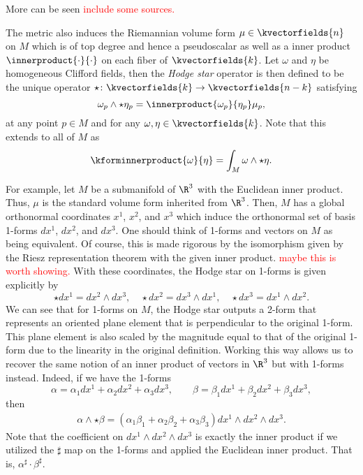   More can be seen \textcolor{red}{include some sources.}




The metric also induces the Riemannian volume form $\mu \in \kvectorfields{n}$ on $M$ which is of top degree and hence a pseudoscalar as well as a inner product $\innerproduct{\cdot}{\cdot}$ on each fiber of $\kvectorfields{k}$. Let $\omega$ and $\eta$ be homogeneous Clifford fields, then the \emph{Hodge star} operator is then defined to be the unique operator $\star \colon \kvectorfields{k} \to \kvectorfields{n-k}$ satisfying
\[
\omega_p \wedge \star \eta_p = \innerproduct{\omega_p}{\eta_p} \mu_p,
\]
at any point $p \in M$ and for any $\omega,\eta \in \kvectorfields{k}$.  Note that this extends to all of $M$ as
\[
\kforminnerproduct{\omega}{\eta} = \int_M \omega \wedge \star \eta.
\]

For example, let $M$ be a submanifold of $\R^3$ with the Euclidean inner product.  Thus, $\mu$ is the standard volume form inherited from $\R^3$. Then, $M$ has a global orthonormal coordinates $x^1$, $x^2$, and $x^3$ which induce the orthonormal set of basis 1-forms  $dx^1$, $dx^2$, and $dx^3$. One should think of 1-forms and vectors on $M$ as being equivalent. Of course, this is made rigorous by the isomorphism given by the Riesz representation theorem with the given inner product. \textcolor{red}{maybe this is worth showing.} With these coordinates, the Hodge star on 1-forms is given explicitly by
\[
\star dx^1 = dx^2 \wedge dx^3, \quad \star dx^2 = dx^3 \wedge dx^1, \quad \star dx^3 = dx^1 \wedge dx^2.
\]
We can see that for 1-forms on $M$, the Hodge star outputs a 2-form that represents an oriented plane element that is perpendicular to the original 1-form. This plane element is also scaled by the magnitude equal to that of the original 1-form due to the linearity in the original definition.  Working this way allows us to recover the same notion of an inner product of vectors in $\R^3$ but with 1-forms instead.  Indeed, if we have the 1-forms
\[
\alpha = \alpha_1 dx^1 + \alpha_2 dx^2 + \alpha_3 dx^3, \qquad \beta = \beta_1 dx^1 + \beta_2 dx^2 + \beta_3 dx^3,
\]
then 
\begin{align*}
\alpha \wedge \star \beta = (\alpha_1 \beta_1 + \alpha_2 \beta_2 + \alpha_3 \beta_3)dx^1\wedge dx^2 \wedge dx^3.
\end{align*}
Note that the coefficient on $dx^1\wedge dx^2 \wedge dx^3$ is exactly the inner product if we utilized the $\sharp$ map on the 1-forms and applied the Euclidean inner product. That is, $\alpha^\sharp \cdot \beta^\sharp$.


